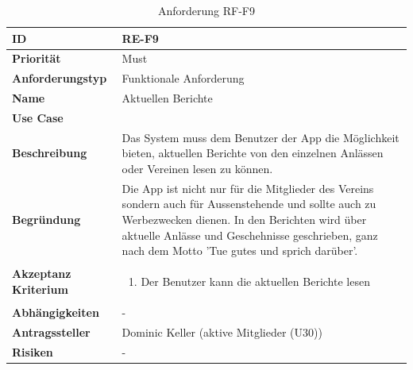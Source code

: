 \begin{table}[ht]
\centering
  \begin{tabular}{ l | p{8cm} }
	\hline
	\rowcolor{gray}
	\textbf{ID} 			&	\textbf{RE-F9}\\ \hline
	\textbf{Priorität} 		&	Must\\ \hline
	\textbf{Anforderungstyp}	&	Funktionale Anforderung\\ \hline
	\textbf{Name} 			&	Aktuellen Berichte\\ \hline
	\textbf{Use Case} 		&	\nameref{table:use_case_6}\\ \hline
	\textbf{Beschreibung} 	&	Das System muss dem Benutzer der App die Möglichkeit bieten, aktuellen Berichte von den einzelnen Anlässen oder Vereinen lesen zu können.\\ \hline
	\textbf{Begründung} 		&	Die App ist nicht nur für die Mitglieder des Vereins sondern auch für Aussenstehende und sollte auch zu Werbezwecken dienen. In den Berichten wird über aktuelle Anlässe und Geschehnisse geschrieben, ganz nach dem Motto 'Tue gutes und sprich darüber'.\\ \hline
	\textbf{Akzeptanz Kriterium}	&	\begin{enumerate}
					\item Der Benutzer kann die aktuellen Berichte lesen
					\end{enumerate}
					\\ \hline
	\textbf{Abhängigkeiten} 	&	-\\ \hline
	\textbf{Antragssteller} 	&	Dominic Keller (aktive Mitglieder (U30))\\ \hline
	\textbf{Risiken}	 	&	-
  \end{tabular}
   \caption{Anforderung RF-F9}\label{table:req_9}
\end{table}

